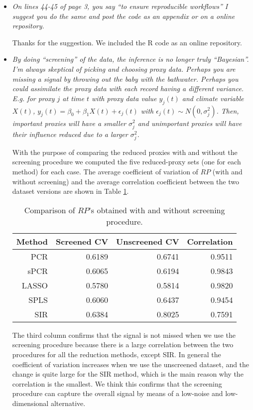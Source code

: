 \documentclass[11pt]{article}
\begin{document}
\begin{itemize}
\item \textit{On lines 44-45 of page 3, you say “to ensure reproducible
    workflows” I suggest you do the same and post the code as an appendix or on
    a online repository.}

  Thanks for the suggestion. We included the R code as an online repository.

  
\item \textit{By doing “screening” of the data, the inference is no longer truly
    “Bayesian”. I'm always skeptical of picking and choosing proxy data. Perhaps
    you are missing a signal by throwing out the baby with the bathwater.
    Perhaps you could assimilate the proxy data with each record having a
    different variance. E.g. for proxy $j$ at time $t$ with proxy data value $y_j(t)$ and climate variable $X(t)$, $y_j(t)=\beta_0+\beta_1X(t)+\epsilon_j(t)$
with $\epsilon_j(t)\sim N(0,\sigma_j^2)$. Then, important proxies will have a
smaller $\sigma_j^2$ and unimportant proxies will have their influence reduced due to a larger $\sigma_j^2$.
}

With the purpose of comparing the reduced proxies with and without the
screening procedure we computed the five reduced-proxy sets (one for each
method) for each case. The average coefficient of variation of $RP$ (with and
without screening) and the
average correlation coefficient between the two dataset versions are shown in Table \ref{tab:screening}.
\begin{table}
  \centering
  \begin{tabular}{r|rr|r}
  \toprule
\textbf{Method} & \textbf{Screened CV} & \textbf{Unscreened CV} & \textbf{Correlation} \\ 
  \midrule
PCR & 0.6189 & 0.6741 & 0.9511 \\ 
  sPCR & 0.6065 & 0.6194 & 0.9843 \\ 
  LASSO & 0.5780 & 0.5814 & 0.9820 \\ 
  SPLS & 0.6060 & 0.6437 & 0.9454 \\ 
  SIR & 0.6384 & 0.8025 & 0.7591 \\ 
   \bottomrule
\end{tabular}
  \caption{Comparison of $RP$'s obtained with and without screening procedure. }
  \label{tab:screening}
\end{table}
The third column confirms that the signal is not missed when we
use the screening procedure because there is a large correlation between the two
procedures for all the reduction methods, except SIR. In general the coefficient
of variation increases when we use the unscreened dataset, and the change is
quite large for the SIR method, which is the main reason why the correlation is
the smallest. We think this confirms that the screening procedure can capture
the overall signal by means of a low-noise and low-dimensional alternative.      



\end{itemize}
\end{document}
